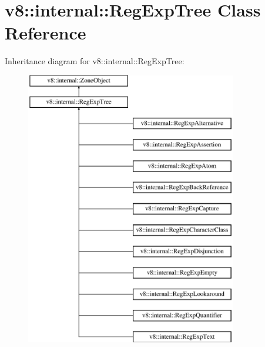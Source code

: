 \hypertarget{classv8_1_1internal_1_1_reg_exp_tree}{}\section{v8\+:\+:internal\+:\+:Reg\+Exp\+Tree Class Reference}
\label{classv8_1_1internal_1_1_reg_exp_tree}
Inheritance diagram for v8\+:\+:internal\+:\+:Reg\+Exp\+Tree\+:\begin{figure}[H]
\begin{center}
\leavevmode
\includegraphics[height=12.000000cm]{classv8_1_1internal_1_1_reg_exp_tree}
\end{center}
\end{figure}
